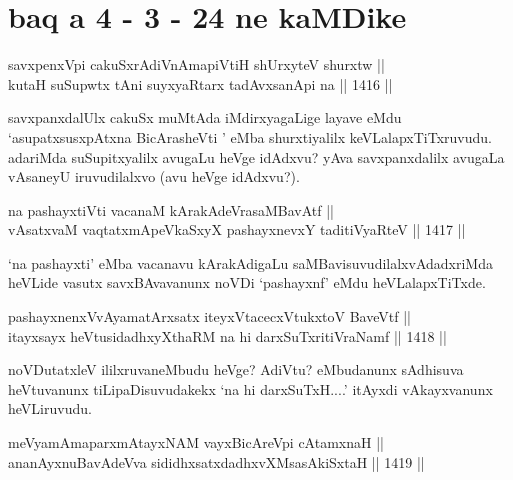 \section*{baq a 4 - 3 - 24 ne kaMDike}

\begin{shl}
savxpenxV\s pi cakuSxrAdiVnAmapiVtiH shUrxyteV shurxtw || \\
kutaH suSupwtx tAni suyxyaRtarx tadAvxsanA\s pi na ||  1416 ||  
\end{shl}

\begin{artha}
savxpanxdalUlx cakuSx muMtAda iMdirxyagaLige layave eMdu `asupatxsusxpAtxna BicArasheVti ' eMba shurxtiyalilx keVLalapxTiTxruvudu. adariMda suSupitxyalilx avugaLu heVge idAdxvu? yAva savxpanxdalilx avugaLa vAsaneyU iruvudilalxvo (avu heVge idAdxvu?).
\end{artha}

\begin{shl}
na pashayxtiVti vacanaM kArakAdeVrasaMBavAtf || \\
vAsatxvaM vaqtatxmApeVkaSxyX pashayxnevxY taditiVyaRteV ||  1417 ||  
\end{shl}

\begin{artha}
`na pashayxti' eMba vacanavu kArakAdigaLu saMBavisuvudilalxvAdadxriMda heVLide vasutx savxBAvavanunx noVDi `pashayxnf' eMdu heVLalapxTiTxde.
\end{artha}

\begin{shl}
pashayxnenxVvAyamatArx\s \s satx iteyxVtacecxVtukxtoV BaveVtf ||  \\
itayxsayx heVtusidadhxyXthaRM na hi darxSuTxritiVraNamf ||  1418 || 
\end{shl}

\begin{artha}
noVDutatxleV ililxruvaneMbudu heVge? AdiVtu? eMbudanunx sAdhisuva heVtuvanunx tiLipaDisuvudakekx `na hi darxSuTxH....' itAyxdi vAkayxvanunx heVLiruvudu.
\end{artha}


\begin{shl}
meVyamAmaparxmAtayxNAM vayxBicAreV\s pi cA\s \s tamxnaH || \\
ananAyxnuBavAdeVva sididhxsatxdadhxvXMsasAkiSxtaH ||  1419 ||  
\end{shl}

